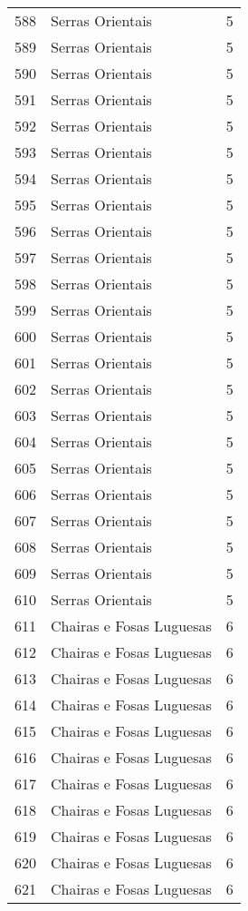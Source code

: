 \begin{table}[p]
\begin{tabular}{rlr}
  588 & Serras Orientais &   5 \\ 
  589 & Serras Orientais &   5 \\ 
  590 & Serras Orientais &   5 \\ 
  591 & Serras Orientais &   5 \\ 
  592 & Serras Orientais &   5 \\ 
  593 & Serras Orientais &   5 \\ 
  594 & Serras Orientais &   5 \\ 
  595 & Serras Orientais &   5 \\ 
  596 & Serras Orientais &   5 \\ 
  597 & Serras Orientais &   5 \\ 
  598 & Serras Orientais &   5 \\ 
  599 & Serras Orientais &   5 \\ 
  600 & Serras Orientais &   5 \\ 
  601 & Serras Orientais &   5 \\ 
  602 & Serras Orientais &   5 \\ 
  603 & Serras Orientais &   5 \\ 
  604 & Serras Orientais &   5 \\ 
  605 & Serras Orientais &   5 \\ 
  606 & Serras Orientais &   5 \\ 
  607 & Serras Orientais &   5 \\ 
  608 & Serras Orientais &   5 \\ 
  609 & Serras Orientais &   5 \\ 
  610 & Serras Orientais &   5 \\ 
  611 & Chairas e Fosas Luguesas &   6 \\ 
  612 & Chairas e Fosas Luguesas &   6 \\ 
  613 & Chairas e Fosas Luguesas &   6 \\ 
  614 & Chairas e Fosas Luguesas &   6 \\ 
  615 & Chairas e Fosas Luguesas &   6 \\ 
  616 & Chairas e Fosas Luguesas &   6 \\ 
  617 & Chairas e Fosas Luguesas &   6 \\ 
  618 & Chairas e Fosas Luguesas &   6 \\ 
  619 & Chairas e Fosas Luguesas &   6 \\ 
  620 & Chairas e Fosas Luguesas &   6 \\ 
  621 & Chairas e Fosas Luguesas &   6 \\ 

\end{tabular}
\end{table}
